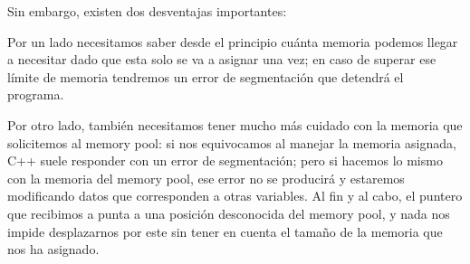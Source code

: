 Sin embargo, existen dos desventajas importantes:

Por un lado necesitamos saber desde el principio cuánta memoria podemos llegar a necesitar dado que esta solo se va a asignar una vez; en caso de superar ese límite de memoria tendremos un error de segmentación que detendrá el programa.

Por otro lado, también necesitamos tener mucho más cuidado con la memoria que solicitemos al memory pool: si nos equivocamos al manejar la memoria asignada, C++ suele responder con un error de segmentación; pero si hacemos lo mismo con la memoria del memory pool, ese error no se producirá y estaremos modificando datos que corresponden a otras variables. Al fin y al cabo, el puntero que recibimos a punta a una posición desconocida del memory pool, y nada nos impide desplazarnos por este sin tener en cuenta el tamaño de la memoria que nos ha asignado.
